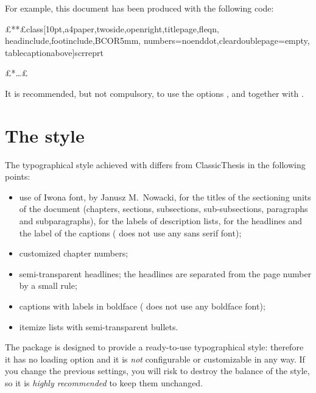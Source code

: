 For example, this document has been produced with the following code:
\begin{code}
\document£**£class[10pt,a4paper,twoside,openright,titlepage,fleqn,%
               headinclude,footinclude,BCOR5mm,%
               numbers=noenddot,cleardoublepage=empty,%
               tablecaptionabove]{scrreprt}

\usepackage{£*\meta{\dots\unkern}*£}
\usepackage{subfig}
\usepackage[eulerchapternumbers,subfig,beramono,%
            eulermath,pdfspacing]{classicthesis}
\usepackage{arsclassica}


£*\dots*£

\end{code}

It is recommended, but not compulsory, to use the options ,  and  together with \arsclassica.






\section{The style}

The typographical style achieved with \arsclassica{} differs from ClassicThesis in the following points:
\begin{itemize}
\item use of Iwona font, by Janusz M.~Nowacki, for the titles of the sectioning units of the document (chapters, sections, subsections, sub-subsections, paragraphs and subparagraphs), for the labels of description lists, for the headlines and the label of the captions (\classicthesis{} does not use any sans serif font);
\item customized chapter numbers;
\item semi-transparent headlines; the headlines are separated from the page number by a small rule;
\item captions with labels in boldface (\classicthesis{} does not use any boldface font);
\item itemize lists with semi-transparent bullets.
\end{itemize}

The \arsclassica{} package is designed  to provide a ready-to-use typographical style: therefore it has no loading option and it is \emph{not} configurable or customizable in any way. If you change the previous settings, you will risk to destroy the balance of the style, so it is \emph{highly recommended} to keep them unchanged.

